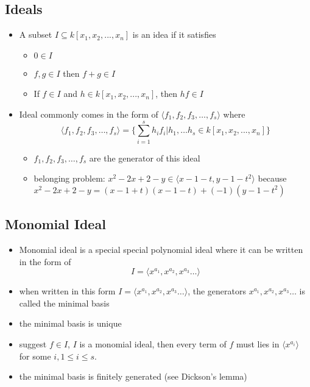 \documentclass[11pt]{article}
\begin{document}
\subsection{Ideals}
\begin{itemize}
    \item A subset $I \subseteq{k[x_1, x_2,..., x_n]}$ is an idea if it satisfies
    \begin{itemize}
        \item $0 \in I$
        \item $f, g \in I$ then $f+g \in I$
        \item If $f \in I$ and $h\in k[x_1, x_2,..., x_n]$, then $hf \in I$
    \end{itemize}
    \item Ideal commonly comes in the form of $\langle f_1, f_2, f_3, \dots, f_s \rangle$ where $$\langle f_1, f_2, f_3, \dots, f_s \rangle = \{\sum_{i=1}^sh_if_i|h_1,\dots h_s \in k[x_1, x_2,..., x_n]\} $$
    \begin{itemize}
        \item $f_1, f_2, f_3, \dots, f_s$ are the generator of this ideal
        \item belonging problem: $x^2-2x+2-y \in \langle x-1-t, y-1-t^2\rangle$ because $x^2-2x+2-y = (x-1+t)(x-1-t) + (-1)(y-1-t^2)$
    \end{itemize}
\end{itemize} 

\subsection{Monomial Ideal}
\begin{itemize}
    \item Monomial ideal is a special special polynomial ideal where it can be written in the form of $$I = \langle x^{a_1}, x^{a_2}, x^{a_3} \dots\rangle$$
    \item when written in this form $I = \langle x^{a_1}, x^{a_2}, x^{a_3} \dots\rangle$, the generators $x^{a_1}, x^{a_2}, x^{a_3} \dots$ is called the minimal basis
        \item the minimal basis is unique
        \item suggest $f\in I$, $I$ is a monomial ideal, then every term of $f$ must lies in $\langle x^{a_i} \rangle$ for some $i, 1\le i \le s$.
        \item the minimal basis is finitely generated (see Dickson's lemma)
\end{itemize}
\end{document}
